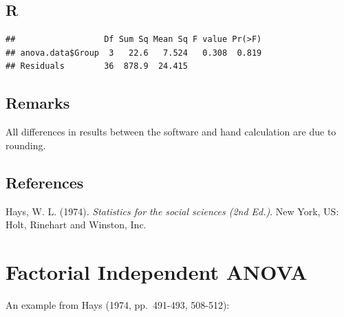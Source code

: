 \documentclass[
]{book}
\newenvironment{Shaded}{\begin{snugshade}}{\end{snugshade}}
\newcommand{\CommentTok}[1]{\textcolor[rgb]{0.56,0.35,0.01}{\textit{#1}}}
\newcommand{\DataTypeTok}[1]{\textcolor[rgb]{0.13,0.29,0.53}{#1}}
\newcommand{\KeywordTok}[1]{\textcolor[rgb]{0.13,0.29,0.53}{\textbf{#1}}}
\newcommand{\NormalTok}[1]{#1}
\newcommand{\OperatorTok}[1]{\textcolor[rgb]{0.81,0.36,0.00}{\textbf{#1}}}
\newcommand{\StringTok}[1]{\textcolor[rgb]{0.31,0.60,0.02}{#1}}
\begin{document}
\hypertarget{r}{%
\subsection{R}\label{r}}

\begin{Shaded}
\end{Shaded}

\begin{verbatim}
##                  Df Sum Sq Mean Sq F value Pr(>F)
## anova.data$Group  3   22.6   7.524   0.308  0.819
## Residuals        36  878.9  24.415
\end{verbatim}

\hypertarget{remarks}{%
\subsection{Remarks}\label{remarks}}

All differences in results between the software and hand calculation are due to rounding.

\hypertarget{references}{%
\subsection{References}\label{references}}

Hays, W. L. (1974). \emph{Statistics for the social sciences (2nd Ed.)}. New York, US: Holt, Rinehart and Winston, Inc.

\hypertarget{factorial-independent-anova}{%
\section{Factorial Independent ANOVA}\label{factorial-independent-anova}}

An example from Hays (1974, pp.~491-493, 508-512):
\end{document}
